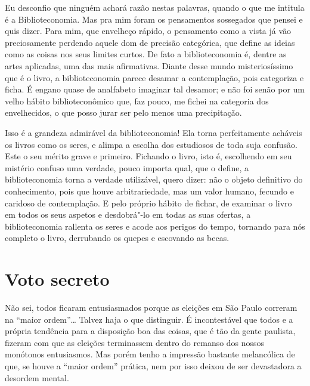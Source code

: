 
Eu desconfio que ninguém achará razão nestas palavras, quando o que me
intitula é a Biblioteconomia. Mas pra mim foram os pensamentos
sossegados que pensei e quis dizer. Para mim, que envelheço rápido, o
pensamento como a vista já vão preciosamente perdendo aquele dom de
precisão categórica, que define as ideias como as coisas nos seus
limites curtos. De fato a biblioteconomia é, dentre as artes aplicadas,
uma das mais afirmativas. Diante desse mundo misteriosíssimo que é o
livro, a biblioteconomia parece desamar a contemplação, pois categoriza
e ficha. É engano quase de analfabeto imaginar tal desamor; e não foi
senão por um velho hábito biblioteconômico que, faz pouco, me fichei na
categoria dos envelhecidos, o que posso jurar ser pelo menos uma
precipitação.

Isso é a grandeza admirável da biblioteconomia! Ela torna perfeitamente
acháveis os livros como os seres, e alimpa a escolha dos estudiosos de
toda suja confusão. Este o seu mérito grave e primeiro. Fichando o
livro, isto é, escolhendo em seu mistério confuso uma verdade, pouco
importa qual, que o define, a biblioteconomia torna a verdade
utilizável, quero dizer: não o objeto definitivo do conhecimento, pois
que houve arbitrariedade, mas um valor humano, fecundo e caridoso de
contemplação. E pelo próprio hábito de fichar, de examinar o livro em
todos os seus aspetos e desdobrá"-lo em todas as suas ofertas, a
biblioteconomia rallenta os seres e acode aos perigos do tempo, tornando
para nós completo o livro, derrubando os quepes e escovando as becas.

\chapter{Voto secreto}

Não sei, todos ficaram entusiasmados porque as eleições em São Paulo
correram na ``maior ordem''\ldots{} Talvez haja o que distinguir. É
incontestável que todos e a própria tendência para a disposição boa das
coisas, que é tão da gente paulista, fizeram com que as eleições
terminassem dentro do remanso dos nossos monótonos entusiasmos. Mas
porém tenho a impressão bastante melancólica de que, se houve a ``maior
ordem'' prática, nem por isso deixou de ser devastadora a desordem
mental.

